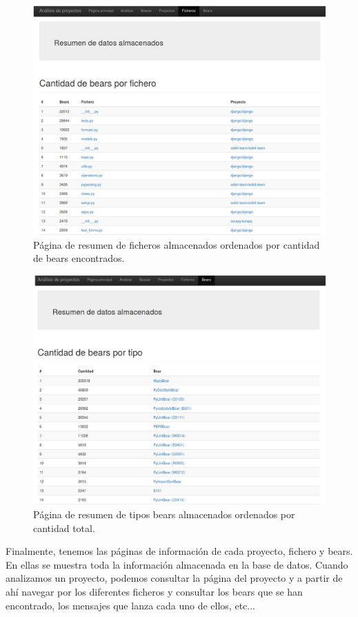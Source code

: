 \documentclass[a4paper, 12pt]{book}
\begin{document}
\begin{figure}[H]
  \centering
  \includegraphics[width=12cm, keepaspectratio]{img/resumenFicheros}
  \caption{Página de resumen de ficheros almacenados ordenados por cantidad de bears encontrados.}
  \label{fig:resumenFicheros}
\end{figure}

\begin{figure}[H]
  \centering
  \includegraphics[width=12cm, keepaspectratio]{img/resumenBears}
  \caption{Página de resumen de tipos bears almacenados ordenados por cantidad total.}
  \label{fig:resumenBears}
\end{figure}

Finalmente, tenemos las páginas de información de cada proyecto, fichero y bears. En ellas se muestra toda la información almacenada en la base de datos. Cuando analizamos un proyecto, podemos consultar la página del proyecto y a partir de ahí navegar por los diferentes ficheros y consultar los bears que se han encontrado, los mensajes que lanza cada uno de ellos, etc...
\end{document}
